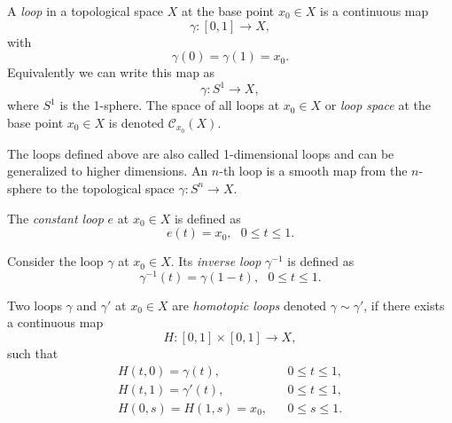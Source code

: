 \begin{definition}[Loop]
 A \textit{loop} in a topological space $X$ at the base point $x_0 \in X$ is a continuous map 
 \begin{equation}
	\gamma: [0,1] \to X,
\end{equation}
with
 \begin{equation}
 	\gamma(0) = \gamma(1) = x_0.
 \end{equation}
 Equivalently we can write  this map as
 \begin{equation}
 	\gamma : S^1 \to X,
 \end{equation}
 where $S^1$ is the 1-sphere.
 The space of all loops at $x_0\in X$ or \textit{loop space} at the base point $x_0\in X$ is denoted $\mathscr{C}_{x_0}(X)$.
\end{definition}
The loops defined above are also called 1-dimensional loops and can be generalized to higher dimensions. An $n$-th loop is a smooth map from the $n$-sphere to the topological space $\gamma : S^{n} \to X$.
\begin{definition} The \textit{constant loop} $e$ at $x_0\in X$ is defined as
	\begin{equation}
		e(t) = x_0, \ \ \ 0\leq t \leq 1.
	\end{equation}
\end{definition}

\begin{definition}
Consider the loop $\gamma$ at $x_0\in X$. Its \textit{inverse loop} $\gamma^{-1}$ is defined as 
	\begin{equation}
		\gamma^{-1}(t) = \gamma(1-t), \ \ \ 0 \leq t \leq 1.
	\end{equation}
\end{definition}

\begin{definition} Two loops $\gamma$ and $\gamma'$ at $x_0 \in X$ are \textit{homotopic loops} denoted $\gamma \sim \gamma'$, if there exists a continuous map
\begin{equation}
	H: [0,1]\times[0,1] \to X,
\end{equation}
such that
\begin{eqnarray}
	H(t,0) = \gamma(t), & & 0\leq t \leq 1, \nonumber \\ 
	H(t,1) = \gamma'(t), & & 0\leq t \leq 1,  \nonumber\\
	H(0,s) = H(1,s) = x_0, & & 0\leq s \leq 1. 
\end{eqnarray}
\end{definition}

